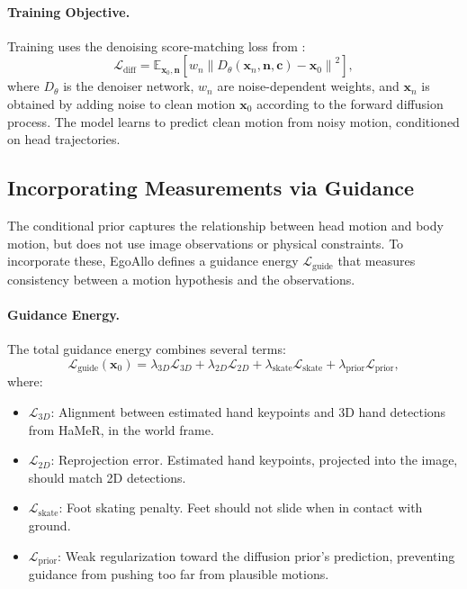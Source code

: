 \paragraph{Training Objective.}
Training uses the denoising score-matching loss from :
\begin{equation}
    \mathcal{L}_{\text{diff}} = \mathbb{E}_{\boldsymbol{x}_0, \boldsymbol{n}} \left[ w_n
    \left\| D_\theta(\boldsymbol{x}_n, \boldsymbol{n}, \boldsymbol{c}) - \boldsymbol{x}_0 \right\|^2 \right],
\end{equation}
where $D_\theta$ is the denoiser network, $w_n$ are noise-dependent
weights, and $\boldsymbol{x}_n$ is obtained by adding noise to clean motion
$\boldsymbol{x}_0$ according to the forward diffusion process. The model
learns to predict clean motion from noisy motion, conditioned on head
trajectories.

\subsection{Incorporating Measurements via Guidance}
\label{sub:egoallo_guidance}

The conditional prior captures the relationship between head motion
and body motion, but does not use image observations or physical
constraints. To incorporate these, EgoAllo defines a guidance energy
$\mathcal{L}_{\text{guide}}$ that measures consistency between a
motion hypothesis and the observations.

\paragraph{Guidance Energy.}
The total guidance energy combines several terms:
\begin{equation}
    \mathcal{L}_{\text{guide}}(\boldsymbol{x}_0) =
    \lambda_{3D}\mathcal{L}_{3D} + \lambda_{2D}\mathcal{L}_{2D} +
    \lambda_{\text{skate}}\mathcal{L}_{\text{skate}} +
    \lambda_{\text{prior}}\mathcal{L}_{\text{prior}},
\end{equation}
where:
\begin{itemize}
    \item $\mathcal{L}_{3D}$: Alignment between estimated hand
        keypoints and 3D hand detections from HaMeR, in the world frame.
    \item $\mathcal{L}_{2D}$: Reprojection error. Estimated hand
        keypoints, projected into the image, should match 2D detections.
    \item $\mathcal{L}_{\text{skate}}$: Foot skating penalty. Feet
        should not slide when in contact with ground.
    \item $\mathcal{L}_{\text{prior}}$: Weak regularization toward
        the diffusion prior's prediction, preventing guidance from
        pushing too far from plausible motions.
\end{itemize}

